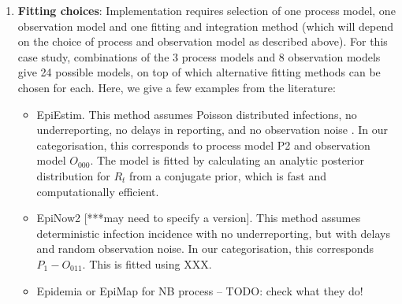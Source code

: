 \documentclass{article}
\begin{document}
\begin{enumerate}
\item \textbf{Fitting choices}: Implementation requires selection of one process model, one observation model and one fitting and integration method (which will depend on the choice of process and observation model as described above). For this case study, combinations of the 3 process models and 8 observation models give 24 possible models, on top of which alternative fitting methods can be chosen for each. Here, we give a few examples from the literature:
\begin{itemize}
    \item EpiEstim. This method assumes Poisson distributed infections, no underreporting, no delays in reporting, and no observation noise \citep{cori2013new}. In our categorisation, this corresponds to process model P2 and observation model $O_{000}$. The model is fitted by calculating an analytic posterior distribution for $R_t$ from a conjugate prior, which is fast and computationally efficient. 
    \item EpiNow2 [***may need to specify a version]. This method assumes deterministic infection incidence with no underreporting, but with delays and random observation noise. In our categorisation, this corresponds $P_1-O_{011}$. This is fitted using XXX.
    \item Epidemia or EpiMap for NB process – TODO: check what they do!
\end{itemize}

 \end{enumerate}
 


\end{document}
